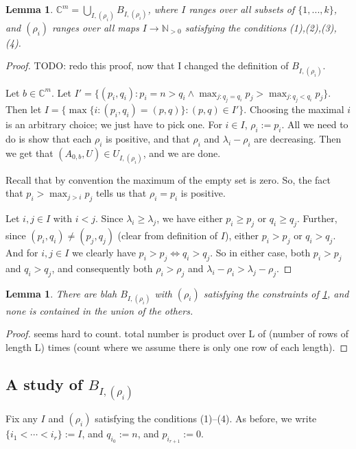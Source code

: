 \documentclass[12pt,psamsfonts]{article}
\newtheorem{lemma}[theorem]{Lemma}
\begin{document}
\begin{lemma}\label{bs_union}
    \(\mathbb{C}^m = \bigcup_{I, (\rho_i)} B_{I, (\rho_i)}\), where \(I\) ranges over all subsets of \(\{1, ..., k\}\), and \((\rho_i)\) ranges over all maps \(I \to \mathbb{N}_{>0}\) satisfying the conditions (1),(2),(3),(4).
\end{lemma}
\begin{proof}
    TODO: redo this proof, now that I changed the definition of \(B_{I, (\rho_i)}\).
    \par Let \(b \in \mathbb{C}^m\).
    Let \(I' = \{(p_i, q_i) : p_i = n > q_i \land \max_{j : q_j = q_i} p_j > \max_{j : q_j < q_i} p_j\}\).
    Then let \(I = \{\max\{i : (p_i, q_i) = (p, q)\} : (p, q) \in I'\}\).
    Choosing the maximal \(i\) is an arbitrary choice; we just have to pick one.
    For \(i \in I\), \(\rho_i := p_i\).
    All we need to do is show that each \(\rho_i\) is positive, and that \(\rho_i\) and \(\lambda_i - \rho_i\) are decreasing.
    Then we get that \((A_{0,b}, U) \in U_{I, (\rho_i)}\), and we are done.
    \par Recall that by convention the maximum of the empty set is zero.
    So, the fact that \(p_i > \max_{j > i} p_j\) tells us that \(\rho_i = p_i\) is positive.
    \par Let \(i, j \in I\) with \(i < j\).
    Since \(\lambda_i \geq \lambda_j\), we have either \(p_i \geq p_j\) or \(q_i \geq q_j\).
    Further, since \((p_i, q_i) \neq (p_j, q_j)\) (clear from definition of \(I\)), either \(p_i > p_j\) or \(q_i > q_j\).
    And for \(i, j \in I\) we clearly have \(p_i > p_j \iff q_i > q_j\).
    So in either case, both \(p_i > p_j\) and \(q_i > q_j\), and consequently both \(\rho_i > \rho_j\) and \(\lambda_i - \rho_i > \lambda_j - \rho_j\).
\end{proof}

\begin{lemma}
    There are blah \(B_{I, (\rho_i)}\) with \((\rho_i)\) satisfying the constraints of \cref{bs_union}, and none is contained in the union of the others.
\end{lemma}
\begin{proof}
    seems hard to count.
    total number is product over L of (number of rows of length L) times (count where we assume there is only one row of each length).
    
\end{proof}

\subsection{A study of \(B_{I, (\rho_i)}\)}
Fix any \(I\) and \((\rho_i)\) satisfying the conditions (1)--(4).
As before, we write \(\{i_1 < \cdots < i_r\} := I\), and \(q_{i_0} := n\), and \(p_{i_{r + 1}} := 0\).
\end{document}
